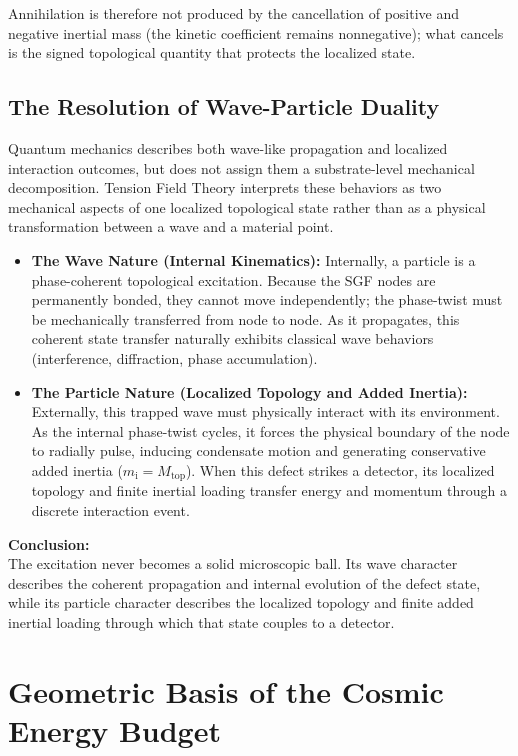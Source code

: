 Annihilation is therefore not produced by the cancellation of positive and negative inertial mass (the kinetic coefficient remains nonnegative); what cancels is the signed topological quantity that protects the localized state.

\section{The Resolution of Wave-Particle Duality}
\label{sec:particle_duality}
Quantum mechanics describes both wave-like propagation and localized interaction outcomes, but does not assign them a substrate-level mechanical decomposition. Tension Field Theory interprets these behaviors as two mechanical aspects of one localized topological state rather than as a physical transformation between a wave and a material point.

\begin{itemize}
    \item \textbf{The Wave Nature (Internal Kinematics):} Internally, a particle is a phase-coherent topological excitation. Because the SGF nodes are permanently bonded, they cannot move independently; the phase-twist must be mechanically transferred from node to node. As it propagates, this coherent state transfer naturally exhibits classical wave behaviors (interference, diffraction, phase accumulation).
    \item \textbf{The Particle Nature (Localized Topology and Added Inertia):} Externally, this trapped wave must physically interact with its environment. As the internal phase-twist cycles, it forces the physical boundary of the node to radially pulse, inducing condensate motion and generating conservative added inertia ($m_{\mathrm{i}} = M_{\mathrm{top}}$). When this defect strikes a detector, its localized topology and finite inertial loading transfer energy and momentum through a discrete interaction event.
\end{itemize}

\noindent\textbf{Conclusion:}\\
The excitation never becomes a solid microscopic ball. Its wave character describes the coherent propagation and internal evolution of the defect state, while its particle character describes the localized topology and finite added inertial loading through which that state couples to a detector.

\chapter{Geometric Basis of the Cosmic Energy Budget}
\label{chap:vacuum_energy_budget}

